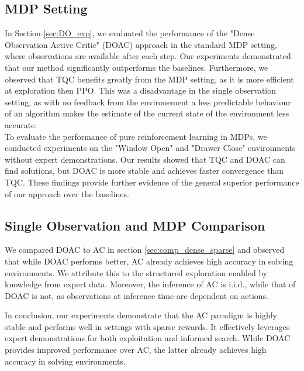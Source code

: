 \subsection{MDP Setting}
In Section \ref{sec:DO_exp}, we evaluated the performance of the "Dense Observation Active Critic" (DOAC) approach in the standard MDP setting, 
where observations are available after each step. Our experiments demonstrated that our 
method significantly outperforms the baselines. Furthermore, we observed that TQC benefits greatly 
from the MDP setting, as it is more efficient at exploration then PPO. This was a disadvantage in the single observation setting, as with no feedback 
from the environement a less predictable behaviour of an algorithm makes the estimate of the current state of the environment less accurate.\\
To evaluate the performance of pure reinforcement learning in MDPs, we conducted experiments on the "Window Open" and "Drawer Close" 
environments without expert demonstrations. Our results showed that TQC and DOAC can find solutions, but DOAC is more stable and achieves 
faster convergence than TQC. These findings provide further evidence of the general superior performance of our approach over the baselines. 

\subsection{Single Observation and MDP Comparison}
We compared DOAC to AC in section \ref{sec:comp_dense_sparse} and observed that while DOAC performs better, 
AC already achieves high accuracy in solving environments. We attribute this to the structured exploration enabled by knowledge from 
expert data. Moreover, the inference of AC is i.i.d., while that of DOAC is not, as observations at inference time are dependent on actions. 

In conclusion, our experiments demonstrate that the AC paradigm is highly stable and performs well in settings with sparse rewards. 
It effectively leverages expert demonstrations for both exploitation and informed search. While DOAC provides improved performance over 
AC, the latter already achieves high accuracy in solving environments.

